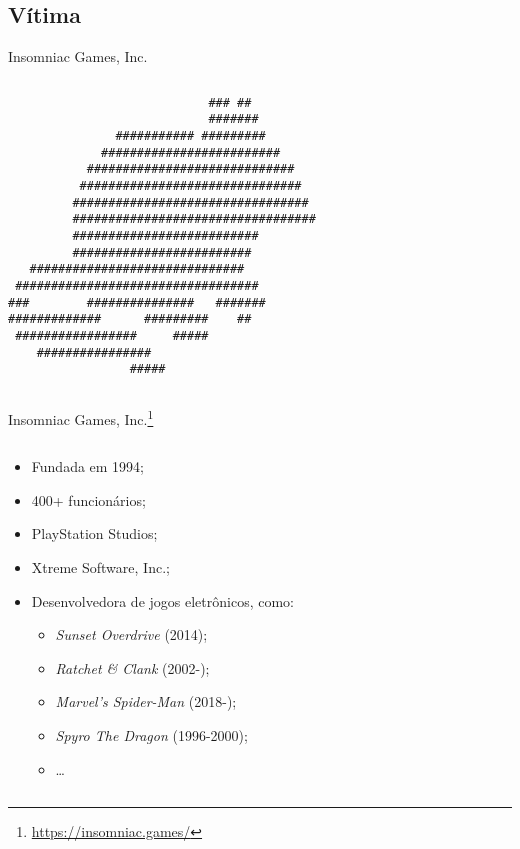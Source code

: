 \documentclass[bookmarks=false,aspectratio=169,9pt]{beamer}
\begin{document}
\subsection{Vítima}
\begin{frame}[fragile]{Insomniac Games, Inc.}
	\begin{columns}
		\begin{column}{0.5\textwidth}
			\begin{verbatim}
                            ### ##
                            #######
               ########### #########
             #########################
           #############################
          ###############################
         #################################
         ##################################
         ##########################
         #########################
   ##############################
 ##################################
###        ###############   #######
#############      #########    ##
 #################     #####
    ################
                 #####
\end{verbatim}
		\end{column}
	\end{columns}
\end{frame}
\begin{frame}{Insomniac Games, Inc.\footnote{\href{https://insomniac.games/}{https://insomniac.games/}}}
	\begin{columns}
		\begin{column}{0.5\textwidth}
			\begin{itemize}
				\item Fundada em 1994;
				\item 400+ funcionários;
				\item PlayStation Studios;
				\item Xtreme Software, Inc.;
				\item Desenvolvedora de jogos eletrônicos, como:
				      \begin{itemize}
					      \item \textit{Sunset Overdrive} (2014);
					      \item \textit{Ratchet \& Clank} (2002-);
					      \item \textit{Marvel's Spider-Man} (2018-);
					      \item \textit{Spyro The Dragon} (1996-2000);
					      \item \dots
				      \end{itemize}
			\end{itemize}
		\end{column}
	\end{columns}
\end{frame}
\end{document}
